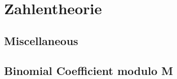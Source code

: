 \section{Zahlentheorie}

\subsection{Miscellaneous}


\subsection{Binomial Coefficient modulo M}



%




%
%
%
%
%



%



%
